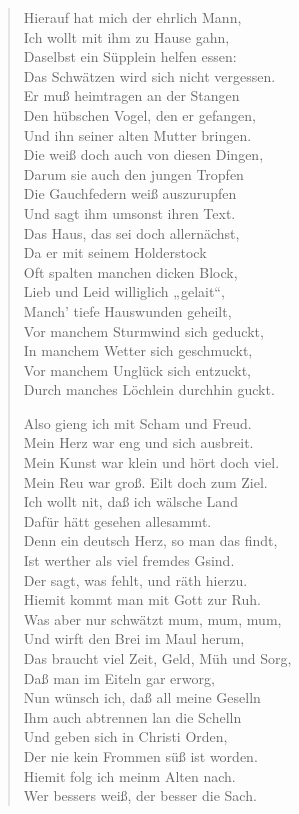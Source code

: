 \begin{verse}
Hierauf hat mich der ehrlich Mann,\\
Ich wollt mit ihm zu Hause gahn,\\
Daselbst ein Süpplein helfen essen:\\
Das Schwätzen wird sich nicht vergessen.\\
Er muß heimtragen an der Stangen\\
Den hübschen Vogel, den er gefangen,\\
Und ihn seiner alten Mutter bringen.\\
Die weiß doch auch von diesen Dingen,\\
Darum sie auch den jungen Tropfen\\
Die Gauchfedern weiß auszurupfen\\
Und sagt ihm umsonst ihren Text.\\
Das Haus, das sei doch allernächst,\\
Da er mit seinem Holderstock\\
Oft spalten manchen dicken Block,\\
Lieb und Leid williglich „gelait“,\\
Manch’ tiefe Hauswunden geheilt,\\
Vor manchem Sturmwind sich geduckt,\\
In manchem Wetter sich geschmuckt,\\
Vor manchem Unglück sich entzuckt,\\
Durch manches Löchlein durchhin guckt.

Also gieng ich mit Scham und Freud.\\
Mein Herz war eng und sich ausbreit.\\
Mein Kunst war klein und hört doch viel.\\
Mein Reu war groß. Eilt doch zum Ziel.\\
Ich wollt nit, daß ich wälsche Land\\
Dafür hätt gesehen allesammt.\\
Denn ein deutsch Herz, so man das findt,\\
Ist werther als viel fremdes Gsind.\\
Der sagt, was fehlt, und räth hierzu.\\
Hiemit kommt man mit Gott zur Ruh.\\
Was aber nur schwätzt mum, mum, mum,\\
Und wirft den Brei im Maul herum,\\
Das braucht viel Zeit, Geld, Müh und Sorg,\\
Daß man im Eiteln gar erworg,\\
Nun wünsch ich, daß all meine Geselln\\
Ihm auch abtrennen lan die Schelln\\
Und geben sich in Christi Orden,\\
Der nie kein Frommen süß ist worden.\\
Hiemit folg ich meinm Alten nach.\\
Wer bessers weiß, der besser die Sach.
\end{verse}

